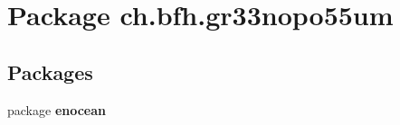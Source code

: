 \section{Package ch.\+bfh.\+gr33nopo55um}
\label{namespacech_1_1bfh_1_1gr33nopo55um}
\subsection*{Packages}
\begin{DoxyCompactItemize}
\item 
package {\bf enocean}
\end{DoxyCompactItemize}
